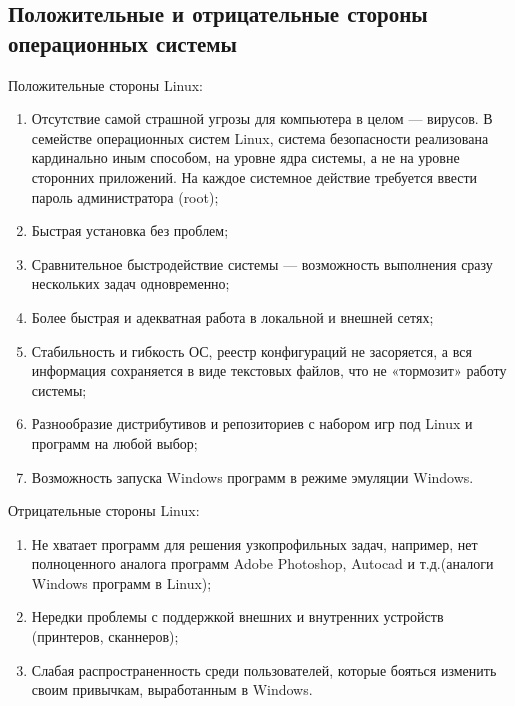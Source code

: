 \documentclass[14pt]{article}
\begin{document}
    \subsection{Положительные и отрицательные стороны операционных системы}
    Положительные стороны Linux:
    \begin{enumerate}
        \item Отсутствие самой страшной угрозы для компьютера в целом --- вирусов. В семействе операционных систем Linux, система безопасности реализована кардинально иным способом, на уровне ядра системы, а не на уровне сторонних приложений. На каждое системное действие требуется ввести пароль администратора (root);
        \item Быстрая установка без проблем;
        \item Сравнительное быстродействие системы --- возможность выполнения сразу нескольких задач одновременно;
        \item Более быстрая и адекватная работа в локальной и внешней сетях;
        \item Стабильность и гибкость ОС, реестр конфигураций не засоряется, а вся информация сохраняется в виде текстовых файлов, что не «тормозит» работу системы;
        \item Разнообразие дистрибутивов и репозиториев с набором игр под Linux и программ на любой выбор;
        \item Возможность запуска Windows программ в режиме эмуляции Windows.
    \end{enumerate}

    Отрицательные стороны Linux:
    \begin{enumerate}
        \item Не хватает программ для решения узкопрофильных задач, например, нет полноценного аналога программ Adobe Photoshop, Autocad и т.д.(аналоги Windows программ в Linux);
        \item Нередки проблемы с поддержкой внешних и внутренних устройств (принтеров, сканнеров);
        \item Слабая распространенность среди пользователей, которые бояться изменить своим привычкам, выработанным в Windows.
    \end{enumerate}
\end{document}
